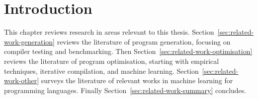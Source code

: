 \section{Introduction}

This chapter reviews research in areas relevant to this thesis. Section~\ref{sec:related-work-generation} reviews the literature of program generation, focusing on compiler testing and benchmarking. Then Section~\ref{sec:related-work-optimisation} reviews the literature of program optimisation, starting with empirical techniques, iterative compilation, and machine learning. Section~\ref{sec:related-work-other} surveys the literature of relevant works in machine learning for programming languages. Finally Section~\ref{sec:related-work-summary} concludes.
